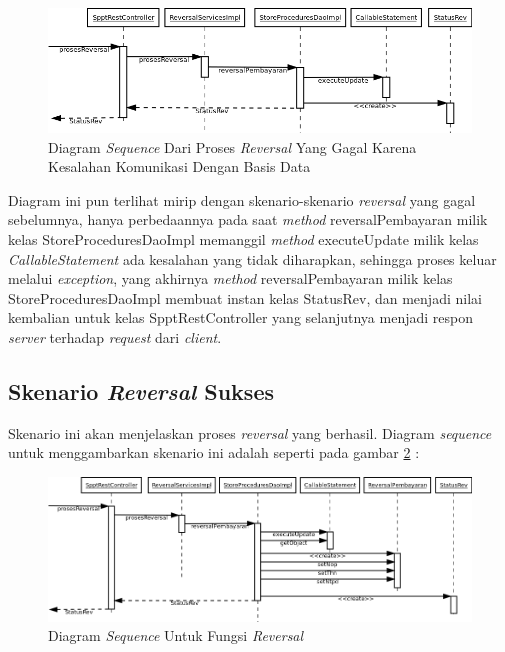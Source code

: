 \begin{figure}[H]
  \centering
  \includegraphics[width=1\textwidth]{./resources/uml/uml-seq-rev-db-error}
  \caption{Diagram \textit{Sequence} Dari Proses \textit{Reversal} Yang Gagal Karena Kesalahan Komunikasi Dengan Basis Data}
  \label{fig:uml-seq-rev-db-error}
\end{figure}

Diagram ini pun terlihat mirip dengan skenario-skenario \textit{reversal} yang gagal sebelumnya, hanya perbedaannya pada saat \textit{method} reversalPembayaran milik kelas StoreProceduresDaoImpl memanggil \textit{method} executeUpdate milik kelas \textit{CallableStatement} ada kesalahan yang tidak diharapkan, sehingga proses keluar melalui \textit{exception}, yang akhirnya \textit{method} reversalPembayaran milik kelas StoreProceduresDaoImpl membuat instan kelas StatusRev, dan menjadi nilai kembalian untuk kelas SpptRestController yang selanjutnya menjadi respon \textit{server} terhadap \textit{request} dari \textit{client}.

\subsection{Skenario \textit{Reversal} Sukses}

Skenario ini akan menjelaskan proses \textit{reversal} yang berhasil. Diagram \textit{sequence} untuk menggambarkan skenario ini adalah seperti pada gambar \ref{fig:uml-seq-rev} :
  
  \begin{figure}[H]
    \centering
    \includegraphics[width=1\textwidth]{./resources/uml/uml-seq-rev}
    \caption{Diagram \textit{Sequence} Untuk Fungsi \textit{Reversal}}
    \label{fig:uml-seq-rev}
  \end{figure}
  
